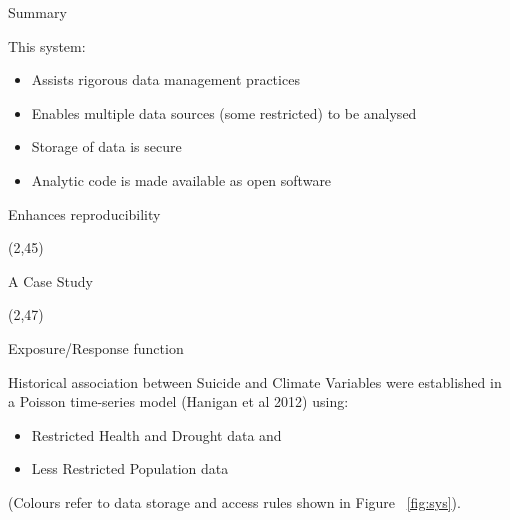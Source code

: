 \documentclass[final]{beamer}
\begin{document}
\begin{frame}{}
\begin{textblock}{17}
\begin{block}{Summary}
\begin{scriptsize}
This system:
\begin{itemize}
\item Assists rigorous data management practices
\item Enables multiple data sources (some restricted) to be analysed
\item Storage of data is secure
\item Analytic code is made available as open software
\end{itemize}


\begin{itemize}
\begin{large}
\item Enhances reproducibility
\end{large}
\end{itemize}
\end{scriptsize}
\end{block}

\end{textblock}

\begin{textblock}{55.5}(2,45)

\begin{block}{A Case Study}
\end{block}

\end{textblock}

\begin{textblock}{17}(2,47)

\begin{block}{Exposure/Response function}
\begin{tiny}

Historical association between Suicide and Climate Variables were established in a Poisson time-series model (Hanigan et al 2012) using:
\begin{itemize}
\item {\color{red}Restricted Health and Drought data} and 
\item {\color{blue}Less Restricted Population data} 
\end{itemize}

(Colours refer to data storage and access rules shown in Figure ~\ref{fig:sys}).



\end{tiny}
\end{block}
\end{textblock}
\end{frame}
\end{document}
